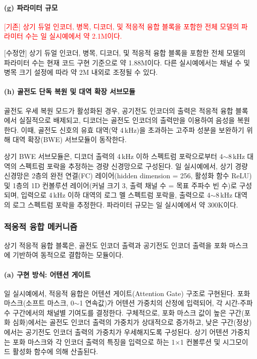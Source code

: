 \documentclass{article}
\newcommand{\reviewold}[1]{{\par\noindent\textcolor{red}{[기존] #1}}}
\newcommand{\reviewnew}[1]{{\par\noindent\textcolor{customblue}{[수정안] #1}}}
\newcommand{\reviewpair}[2]{\reviewold{#1}\reviewnew{#2}\par}
\begin{document}
\paragraph{(g) 파라미터 규모}

\reviewpair{상기 듀얼 인코더, 병목, 디코더, 및 적응적 융합 블록을 포함한 전체 모델의 파라미터 수는 일 실시예에서 약 2.1M이다.}{상기 듀얼 인코더, 병목, 디코더, 및 적응적 융합 블록을 포함한 전체 모델의 파라미터 수는 현재 코드 구현 기준으로 약 1.88M이다. 다른 실시예에서는 채널 수 및 병목 크기 설정에 따라 약 2M 내외로 조정될 수 있다.}

\paragraph{(h) 골전도 단독 복원 및 대역 확장 서브모듈}

골전도 우세 복원 모드가 활성화된 경우, 공기전도 인코더의 출력은 적응적 융합 블록에서 실질적으로 배제되고, 디코더는 골전도 인코더의 출력만을 이용하여 음성을 복원한다. 이때, 골전도 신호의 유효 대역(약 4\,kHz)을 초과하는 고주파 성분을 보완하기 위해 대역 확장(BWE) 서브모듈이 동작한다.

상기 BWE 서브모듈은, 디코더 출력의 4\,kHz 이하 스펙트럼 포락으로부터 4$\sim$8\,kHz 대역의 스펙트럼 포락을 추정하는 경량 신경망으로 구성된다. 일 실시예에서, 상기 경량 신경망은 2층의 완전 연결(FC) 레이어(hidden dimension = 256, 활성화 함수 ReLU) 및 1층의 1D 컨볼루션 레이어(커널 크기 3, 출력 채널 수 = 목표 주파수 빈 수)로 구성되며, 입력으로 4\,kHz 이하 대역의 로그 멜 스펙트럼 포락을, 출력으로 4$\sim$8\,kHz 대역의 로그 스펙트럼 포락을 추정한다. 파라미터 규모는 일 실시예에서 약 300K이다.

\subsubsection{적응적 융합 메커니즘}

상기 적응적 융합 블록은, 골전도 인코더 출력과 공기전도 인코더 출력을 포화 마스크에 기반하여 동적으로 결합하는 모듈이다.

\paragraph{(a) 구현 방식: 어텐션 게이트}

일 실시예에서, 적응적 융합은 어텐션 게이트(Attention Gate) 구조로 구현된다. 포화 마스크(소프트 마스크, 0$\sim$1 연속값)가 어텐션 가중치의 산정에 입력되어, 각 시간-주파수 구간에서의 채널별 기여도를 결정한다. 구체적으로, 포화 마스크 값이 높은 구간(포화 심화)에서는 골전도 인코더 출력의 가중치가 상대적으로 증가하고, 낮은 구간(정상)에서는 공기전도 인코더 출력의 가중치가 우세해지도록 구성된다. 상기 어텐션 가중치는 포화 마스크와 각 인코더 출력의 특징을 입력으로 하는 1$\times$1 컨볼루션 및 시그모이드 활성화 함수에 의해 산출된다.
\end{document}
